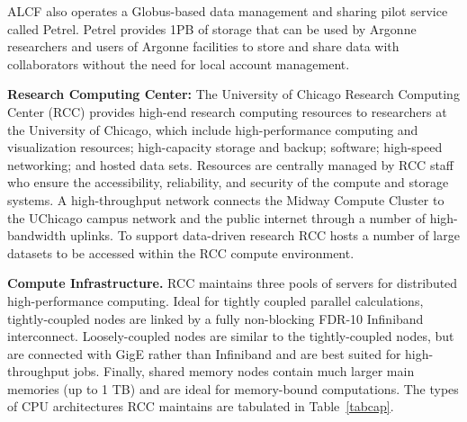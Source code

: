 \documentclass[onecolumn, compsoc,12pt]{IEEEtran}
\begin{document}
ALCF also operates a Globus-based data management and sharing pilot service called Petrel. 
Petrel provides 1PB of storage that can be used by Argonne researchers and users of Argonne facilities to store and 
share data with collaborators without the need for local account management. 


\textbf{Research Computing Center:} The University of Chicago Research Computing Center (RCC) provides high-end research computing resources to researchers at the University of Chicago, which include high-performance computing and visualization resources; high-capacity storage and backup; software; high-speed networking; and hosted data sets. Resources are centrally managed by RCC staff who ensure the accessibility, reliability, and security of the compute and storage systems. A high-throughput network connects the Midway Compute Cluster to the UChicago campus network and the public internet through a number of high-bandwidth uplinks. To support data-driven research RCC hosts a number of large datasets to be accessed within the RCC compute environment.

\textbf{Compute Infrastructure.} RCC maintains three pools of servers for distributed high-performance computing. Ideal for tightly coupled parallel calculations, tightly-coupled nodes are linked by a fully non-blocking FDR-10 Infiniband interconnect. Loosely-coupled nodes are similar to the tightly-coupled nodes, but are connected with GigE rather than Infiniband and are best suited for high-throughput jobs. Finally,  shared memory nodes contain much larger main memories (up to 1 TB) and are ideal for memory-bound computations. The types of CPU architectures RCC maintains are tabulated in Table~\ref{tabcap}.
\end{document}

